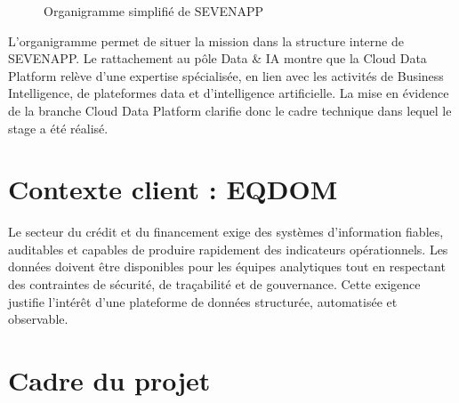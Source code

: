 \begin{figure}[H]
{
}
\caption{Organigramme simplifié de SEVENAPP}
\label{fig:organigramme-sevenapp}
\end{figure}

L'organigramme permet de situer la mission dans la structure interne de SEVENAPP. Le rattachement au pôle Data \& IA montre que la Cloud Data Platform relève d'une expertise spécialisée, en lien avec les activités de Business Intelligence, de plateformes data et d'intelligence artificielle. La mise en évidence de la branche Cloud Data Platform clarifie donc le cadre technique dans lequel le stage a été réalisé.

\section{Contexte client : EQDOM}



Le secteur du crédit et du financement exige des systèmes d'information fiables, auditables et capables de produire rapidement des indicateurs opérationnels. Les données doivent être disponibles pour les équipes analytiques tout en respectant des contraintes de sécurité, de traçabilité et de gouvernance. Cette exigence justifie l'intérêt d'une plateforme de données structurée, automatisée et observable.

\section{Cadre du projet}


